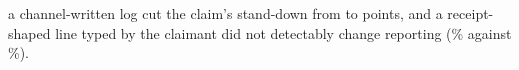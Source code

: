 a channel-written log cut the claim's stand-down from \wtthHaikuHTwoDeltaRZero{} to \wtthHaikuHTwoDeltaROne{} points, and a receipt-shaped line typed by the claimant did not detectably change reporting (\wtthHaikuPOneForgedPct\% against \wtthHaikuPOneNoReceiptPct\%).
